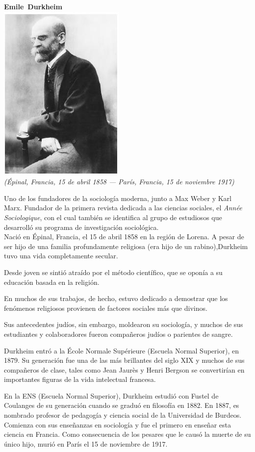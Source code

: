 \begin{center}
\textbf{Emile\ Durkheim}\\
	\includegraphics[scale=0.5]{images/durkheim}\\
	 \emph{(Épinal, Francia, 15 de abril 1858 — París, Francia, 15 de noviembre 1917)}\\
\end{center}
Uno de los fundadores de la sociología moderna, junto a Max Weber y Karl Marx.
Fundador de la primera revista dedicada a las ciencias sociales, el \emph{Année Sociologique},
con el cual también se identifica al grupo de estudiosos que desarrolló su programa de investigación sociológica.\\

Nació en Épinal, Francia, el 15 de abril 1858 en la región de Lorena.
A pesar de ser hijo de una familia profundamente religiosa (era hijo de un rabino),Durkheim tuvo una vida completamente secular.

Desde joven se sintió atraído por el método científico, que se oponía a su educación basada en la religión.

En muchos de sus trabajos, de hecho, estuvo dedicado a demostrar que los fenómenos religiosos provienen de factores sociales más que divinos.

Sus antecedentes judíos, sin embargo, moldearon su sociología, y muchos de sus estudiantes y colaboradores fueron compañeros judíos o parientes de sangre.

Durkheim entró a la École Normale Supérieure (Escuela Normal Superior), en 1879.
Su generación fue una de las más brillantes del siglo XIX y muchos de sus compañeros de clase, tales como Jean Jaurès y Henri Bergson se convertirían en importantes figuras de la vida intelectual francesa.

En la ENS (Escuela Normal Superior), Durkheim estudió con Fustel de Coulanges de su generación cuando se graduó en filosofía en 1882.
En 1887, es nombrado profesor de pedagogía y ciencia social de la Universidad de Burdeos.
Comienza con sus enseñanzas en sociología y fue el primero en enseñar esta ciencia en Francia.
Como consecuencia de los pesares que le causó la muerte de su único hijo, murió en París el 15 de noviembre de 1917.


\newpage
